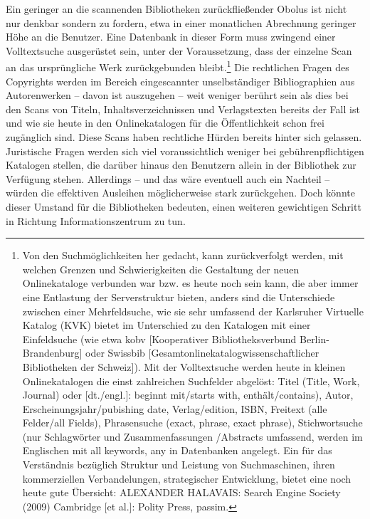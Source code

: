 \documentclass[a4paper,
fontsize=11pt,
oneside,
numbers=noperiodatend,
parskip=half-,
bibliography=totoc,
final
]{scrartcl}
\begin{document}
Ein geringer an die scannenden Bibliotheken zurückfließender Obolus ist
nicht nur denkbar sondern zu fordern, etwa in einer monatlichen
Abrechnung geringer Höhe an die Benutzer. Eine Datenbank in dieser Form
muss zwingend einer Volltextsuche ausgerüstet sein, unter der
Voraussetzung, dass der einzelne Scan an das ursprüngliche Werk
zurückgebunden bleibt.\footnote{Von den Suchmöglichkeiten her gedacht,
  kann zurückverfolgt werden, mit welchen Grenzen und Schwierigkeiten
  die Gestaltung der neuen Onlinekataloge verbunden war bzw. es heute
  noch sein kann, die aber immer eine Entlastung der Serverstruktur
  bieten, anders sind die Unterschiede zwischen einer Mehrfeldsuche, wie
  sie sehr umfassend der Karlsruher Virtuelle Katalog (KVK) bietet im
  Unterschied zu den Katalogen mit einer Einfeldsuche (wie etwa kobv
  {[}Kooperativer Bibliotheksverbund Berlin-Brandenburg{]} oder Swissbib
  {[}Gesamtonlinekatalogwissenschaftlicher Bibliotheken der Schweiz{]}).
  Mit der Volltextsuche werden heute in kleinen Onlinekatalogen die
  einst zahlreichen Suchfelder abgelöst: Titel (Title, Work, Journal)
  oder {[}dt./engl.{]}: beginnt mit/starts with, enthält/contains),
  Autor, Erscheinungsjahr/pubishing date, Verlag/edition, ISBN, Freitext
  (alle Felder/all Fields), Phrasensuche (exact, phrase, exact phrase),
  Stichwortsuche (nur Schlagwörter und Zusammenfassungen /Abstracts
  umfassend, werden im Englischen mit all keywords, any in Datenbanken
  angelegt. Ein für das Verständnis bezüglich Struktur und Leistung von
  Suchmaschinen, ihren kommerziellen Verbandelungen, strategischer
  Entwicklung, bietet eine noch heute gute Übersicht: ALEXANDER
  HALAVAIS: Search Engine Society (2009) Cambridge {[}et al.{]}: Polity
  Press, passim.} Die rechtlichen Fragen des Copyrights werden im
Bereich eingescannter unselbständiger Bibliographien aus Autorenwerken
-- davon ist auszugehen -- weit weniger berührt sein als dies bei den
Scans von Titeln, Inhaltsverzeichnissen und Verlagstexten bereits der
Fall ist und wie sie heute in den Onlinekatalogen für die Öffentlichkeit
schon frei zugänglich sind. Diese Scans haben rechtliche Hürden bereits
hinter sich gelassen. Juristische Fragen werden sich viel
voraussichtlich weniger bei gebührenpflichtigen Katalogen stellen, die
darüber hinaus den Benutzern allein in der Bibliothek zur Verfügung
stehen. Allerdings -- und das wäre eventuell auch ein Nachteil -- würden
die effektiven Ausleihen möglicherweise stark zurückgehen. Doch könnte
dieser Umstand für die Bibliotheken bedeuten, einen weiteren gewichtigen
Schritt in Richtung Informationszentrum zu tun.
\end{document}
